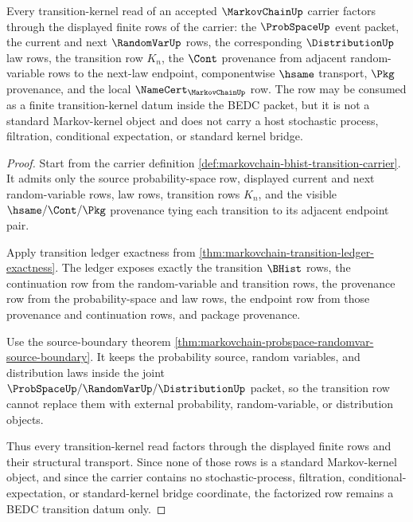 \begin{theorem}
\label{thm:markovchain-transition-kernel-row-factorization}
Every transition-kernel read of an accepted $\MarkovChainUp$ carrier factors through the displayed finite rows of the carrier: the $\ProbSpaceUp$ event packet, the current and next $\RandomVarUp$ rows, the corresponding $\DistributionUp$ law rows, the transition row $K_n$, the $\Cont$ provenance from adjacent random-variable rows to the next-law endpoint, componentwise $\hsame$ transport, $\Pkg$ provenance, and the local $\NameCert_{\MarkovChainUp}$ row. The row may be consumed as a finite transition-kernel datum inside the BEDC packet, but it is not a standard Markov-kernel object and does not carry a host stochastic process, filtration, conditional expectation, or standard kernel bridge.
\end{theorem}
\begin{proof}
Start from the carrier definition \autoref{def:markovchain-bhist-transition-carrier}. It admits only the source probability-space row, displayed current and next random-variable rows, law rows, transition rows $K_n$, and the visible $\hsame/\Cont/\Pkg$ provenance tying each transition to its adjacent endpoint pair.

Apply transition ledger exactness from \autoref{thm:markovchain-transition-ledger-exactness}. The ledger exposes exactly the transition $\BHist$ rows, the continuation row from the random-variable and transition rows, the provenance row from the probability-space and law rows, the endpoint row from those provenance and continuation rows, and package provenance.

Use the source-boundary theorem \autoref{thm:markovchain-probspace-randomvar-source-boundary}. It keeps the probability source, random variables, and distribution laws inside the joint $\ProbSpaceUp/\RandomVarUp/\DistributionUp$ packet, so the transition row cannot replace them with external probability, random-variable, or distribution objects.

Thus every transition-kernel read factors through the displayed finite rows and their structural transport. Since none of those rows is a standard Markov-kernel object, and since the carrier contains no stochastic-process, filtration, conditional-expectation, or standard-kernel bridge coordinate, the factorized row remains a BEDC transition datum only.
\end{proof}

